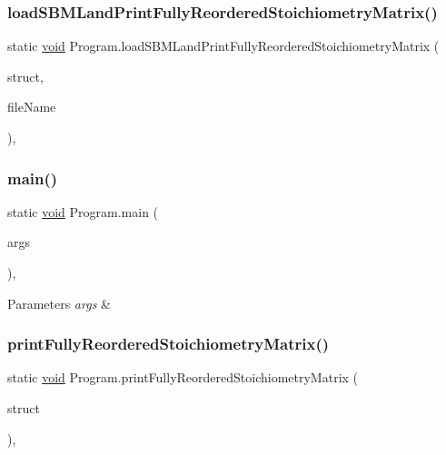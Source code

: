 \subsubsection{\texorpdfstring{load\+S\+B\+M\+Land\+Print\+Fully\+Reordered\+Stoichiometry\+Matrix()}{loadSBMLandPrintFullyReorderedStoichiometryMatrix()}}
{\footnotesize\ttfamily static \hyperlink{lp__lib_8h_ac7828c7b2b31d2e11af17bdb6289c5d9}{void} Program.\+load\+S\+B\+M\+Land\+Print\+Fully\+Reordered\+Stoichiometry\+Matrix (\begin{DoxyParamCaption}\item[{Lib\+Structural}]{struct,  }\item[{String}]{file\+Name }\end{DoxyParamCaption})\hspace{0.3cm}{\ttfamily [inline]}, {\ttfamily [static]}}

\mbox{\label{class_program_acce23ed8021e15e6d1b99a195c94c43e}} 
\subsubsection{\texorpdfstring{main()}{main()}}
{\footnotesize\ttfamily static \hyperlink{lp__lib_8h_ac7828c7b2b31d2e11af17bdb6289c5d9}{void} Program.\+main (\begin{DoxyParamCaption}\item[{String \mbox{[}$\,$\mbox{]}}]{args }\end{DoxyParamCaption})\hspace{0.3cm}{\ttfamily [inline]}, {\ttfamily [static]}}


\begin{DoxyParams}{Parameters}
{\em args} & \\
\hline
\end{DoxyParams}
\mbox{\label{class_program_a7f3a62c279ae57e61c3ade3abe3d1293}} 
\subsubsection{\texorpdfstring{print\+Fully\+Reordered\+Stoichiometry\+Matrix()}{printFullyReorderedStoichiometryMatrix()}}
{\footnotesize\ttfamily static \hyperlink{lp__lib_8h_ac7828c7b2b31d2e11af17bdb6289c5d9}{void} Program.\+print\+Fully\+Reordered\+Stoichiometry\+Matrix (\begin{DoxyParamCaption}\item[{Lib\+Structural}]{struct }\end{DoxyParamCaption})\hspace{0.3cm}{\ttfamily [inline]}, {\ttfamily [static]}}

